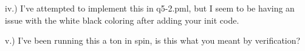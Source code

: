 \documentclass[11pt]{article}
\begin{document}
\begin{enumerate}
\begin{minipage}{\minpagw}
{{        iv.) I've attempted to implement this in q5-2.pml, but I seem to be having an issue with the white black coloring after adding your init code.
        
        v.) I've been running this a ton in spin, is this what you meant by verification?
      
    }%
  }%
\end{minipage}

\end{enumerate}
\end{document}
